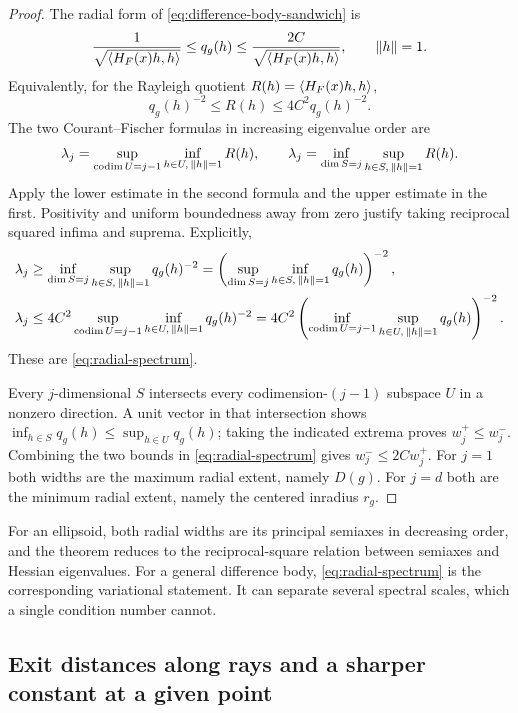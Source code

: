 \begin{proof}
The radial form of \eqref{eq:difference-body-sandwich} is
\[
 \frac1{\sqrt{\left\langle H_F(x)h,h\right\rangle}}
 \leq q_g(h)\leq
 \frac{2C}{\sqrt{\left\langle H_F(x)h,h\right\rangle}},\qquad \left\lVert h\right\rVert=1.
\]
Equivalently, for the Rayleigh quotient $R(h)=\left\langle H_F(x)h,h\right\rangle$,
\begin{equation}
 q_g(h)^{-2}\leq R(h)\leq4C^2q_g(h)^{-2}.
 \label{eq:radial-rayleigh}
\end{equation}
The two Courant--Fischer formulas in increasing eigenvalue order are
\[
 \lambda_j=\sup_{\operatorname{codim}U=j-1}
                   \inf_{h\in U,\,\left\lVert h\right\rVert=1}R(h),\qquad
 \lambda_j=\inf_{\dim S=j}
                   \sup_{h\in S,\,\left\lVert h\right\rVert=1}R(h).
\]
Apply the lower estimate in the second formula and the upper estimate
in the first. Positivity and uniform boundedness away from zero justify
taking reciprocal squared infima and suprema. Explicitly,
\begin{align*}
 \lambda_j&\geq\inf_{\dim S=j}\sup_{h\in S,\,\left\lVert h\right\rVert=1}q_g(h)^{-2}
   =\left(\sup_{\dim S=j}\inf_{h\in S,\,\left\lVert h\right\rVert=1}q_g(h)\right)^{-2},\\
 \lambda_j&\leq4C^2\sup_{\operatorname{codim}U=j-1}
                    \inf_{h\in U,\,\left\lVert h\right\rVert=1}q_g(h)^{-2}
   =4C^2\left(\inf_{\operatorname{codim}U=j-1}
                    \sup_{h\in U,\,\left\lVert h\right\rVert=1}q_g(h)\right)^{-2}.
\end{align*}
These are \eqref{eq:radial-spectrum}.

Every $j$-dimensional $S$ intersects every codimension-$(j-1)$ subspace
$U$ in a nonzero direction. A unit vector in that intersection shows
$\inf_{h\in S}q_g(h)\leq\sup_{h\in U}q_g(h)$; taking the indicated
extrema proves $w_j^+\leq w_j^-$. Combining the two bounds in
\eqref{eq:radial-spectrum} gives $w_j^-\leq2Cw_j^+$.
For $j=1$ both widths are the maximum
radial extent, namely $D(g)$. For $j=d$ both are the minimum radial
extent, namely the centered inradius $r_g$.
\end{proof}

For an ellipsoid, both radial widths are its principal semiaxes in
decreasing order, and the theorem reduces to the reciprocal-square
relation between semiaxes and Hessian eigenvalues. For a general
difference body, \eqref{eq:radial-spectrum} is the corresponding
variational statement. It can separate several spectral scales, which a
single condition number cannot.

\subsection{Exit distances along rays and a sharper constant at a given point}

